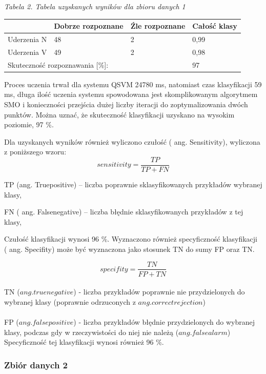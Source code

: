 \documentclass[[10pt,a4paper]{article}
\begin{document}
\begin{enumerate}
\begin{itemize}
\textit{Tabela 2. Tabela uzyskanych wyników dla zbioru danych 1}
\newline
\begin{tabular}{|p{1.1in}|p{1.1in}|p{1.1in}|p{1.1in}|} \hline 
 & Dobrze rozpoznane & \'{Z}le rozpoznane & Całość klasy  \\ \hline 
Uderzenia N & 48 & 2 & 0,99 \\ \hline 
Uderzenia V & 49 & 2 & 0,98 \\ \hline 
\multicolumn{3}{|p{1in}|}{Skuteczność rozpoznawania [\%]:} & 97 \\ \hline 
\end{tabular}



\noindent Proces uczenia trwał dla systemu QSVM 24780 ms, natomiast czas klasyfikacji 59 ms, długa ilość uczenia systemu spowodowana jest skomplikowanym algorytmem SMO i konieczności przejścia dużej liczby iteracji do zoptymalizowania dwóch punktów. Można uznać, że skuteczność klasyfikacji uzyskano na wysokim poziomie, 97 \%. 

\noindent Dla uzyskanych wyników również wyliczono czułość ( ang. Sensitivity), wyliczona z poniższego wzoru:
 $$
sensitivity = \frac{TP}{TP + FN}
$$

\noindent TP (ang. Truepositive) -- liczba poprawnie sklasyfikowanych przykładów wybranej klasy,

\noindent FN ( ang. Falsenegative) -- liczba błędnie sklasyfikowanych przykładów z tej klasy,

\noindent Czułość klasyfikacji wynosi 96 \%. Wyznaczono również specyficzność klasyfikacji ( ang. Specifity) może być wyznaczona jako stosunek TN do sumy FP oraz TN.

 $$
specifity = \frac{TN}{FP + TN}
$$
\\
TN ($ang. true negative$) - liczba przykładów poprawnie nie przydzielonych do wybranej klasy (poprawnie odrzuconych z $ang. correct rejection$)\\
\\
FP ($ang. false positive$) - liczba przykładów błędnie przydzielonych do wybranej klasy, podczas gdy w rzeczywistości do niej nie należą ($ang. false alarm$)\\

\noindent Specyficzność tej klasyfikacji wynosi również 96 \%. 

\subsubsection{Zbiór danych 2} 


\end{itemize}
\end{enumerate}
\end{document}

